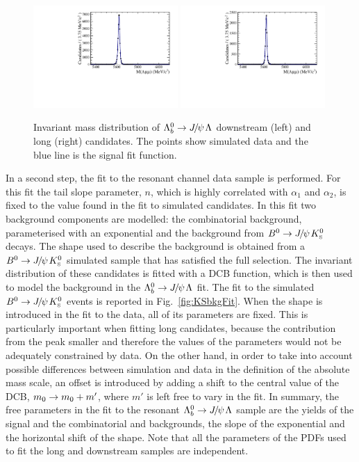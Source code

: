 \begin{figure}
\centering
\includegraphics[width=0.49\textwidth]{Lmumu/figs/MassFits/fitLb2JpsiL_DD_MC.pdf}
\includegraphics[width=0.49\textwidth]{Lmumu/figs/MassFits/fitLb2JpsiL_LL_MC.pdf}
\caption{Invariant mass distribution of $\Lb\ra\jpsi\Lz$ downstream (left) and long (right) candidates.
The points show simulated data and the blue line is the signal fit function.}
\label{fig:Lb_jpsiMCfit}
\end{figure}

In a second step, the fit to the resonant channel data sample is performed.
For this fit the tail slope parameter, $n$, which is highly correlated
with $\alpha_1$ and $\alpha_2$, is fixed to the value found in the fit to simulated candidates.
In this fit two background components are modelled: the combinatorial background,
parameterised with an exponential and the background from $\Bz\ra\jpsi\KS$ decays.
The shape used to describe the \KS background is obtained from a $\Bz\ra\jpsi\KS$ simulated
sample that has satisfied the full selection. The invariant distribution of these candidates
is fitted with a DCB function, which is then used to model the \KS background
in the $\Lb\to\jpsi\Lz$ fit. The fit to the simulated $\Bz\ra\jpsi\KS$ events
is reported in Fig.~\ref{fig:KSbkgFit}. When the \KS shape is introduced in the fit to the data, all
of its parameters are fixed. This is particularly important when fitting long candidates, because the 
contribution from the \KS peak smaller and therefore the values of the parameters would 
not be adequately constrained by data. On the other hand, in order
to take into account possible differences between simulation and data in the definition of the
absolute mass scale, an offset is introduced by adding a shift to the central value 
of the DCB, $m_0 \rightarrow m_0 + m'$, where $m'$ is left free to vary in the fit.
In summary, the free parameters in the fit to the resonant $\Lb\to\jpsi\Lz$ sample
are the yields of the signal and the combinatorial and \KS backgrounds, the slope
of the exponential and the horizontal shift of the \KS shape. Note that all the parameters
of the PDFs used to fit the long and downstream samples are independent.

